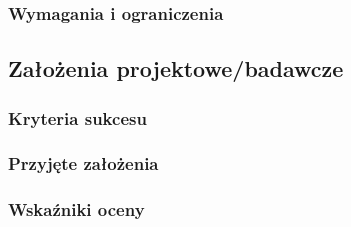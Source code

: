 \subsubsection*{Wymagania i ograniczenia}

\subsection{Założenia projektowe/badawcze}
\subsubsection*{Kryteria sukcesu}
\subsubsection*{Przyjęte założenia}
\subsubsection*{Wskaźniki oceny}

